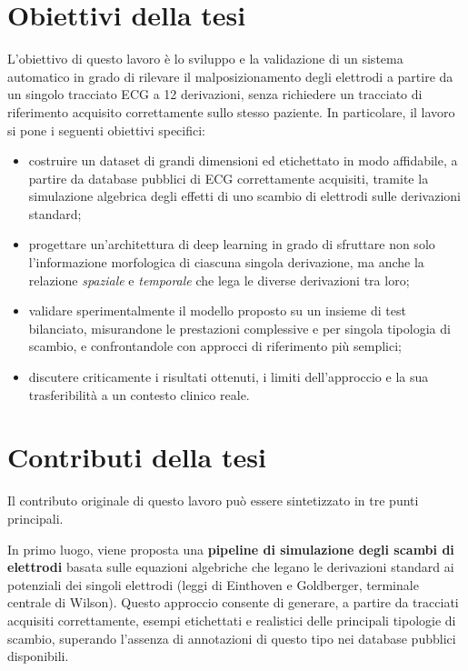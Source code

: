 \section*{Obiettivi della tesi}

L'obiettivo di questo lavoro è lo sviluppo e la validazione di un sistema automatico in grado di rilevare il malposizionamento degli elettrodi a partire da un singolo tracciato ECG a 12 derivazioni, senza richiedere un tracciato di riferimento acquisito correttamente sullo stesso paziente. In particolare, il lavoro si pone i seguenti obiettivi specifici:

\begin{itemize}
    \item costruire un dataset di grandi dimensioni ed etichettato in modo affidabile, a partire da database pubblici di ECG correttamente acquisiti, tramite la simulazione algebrica degli effetti di uno scambio di elettrodi sulle derivazioni standard;
    \item progettare un'architettura di deep learning in grado di sfruttare non solo l'informazione morfologica di ciascuna singola derivazione, ma anche la relazione \emph{spaziale} e \emph{temporale} che lega le diverse derivazioni tra loro;
    \item validare sperimentalmente il modello proposto su un insieme di test bilanciato, misurandone le prestazioni complessive e per singola tipologia di scambio, e confrontandole con approcci di riferimento più semplici;
    \item discutere criticamente i risultati ottenuti, i limiti dell'approccio e la sua trasferibilità a un contesto clinico reale.
\end{itemize}

\section*{Contributi della tesi}

Il contributo originale di questo lavoro può essere sintetizzato in tre punti principali.

In primo luogo, viene proposta una \textbf{pipeline di simulazione degli scambi di elettrodi} basata sulle equazioni algebriche che legano le derivazioni standard ai potenziali dei singoli elettrodi (leggi di Einthoven e Goldberger, terminale centrale di Wilson). Questo approccio consente di generare, a partire da tracciati acquisiti correttamente, esempi etichettati e realistici delle principali tipologie di scambio, superando l'assenza di annotazioni di questo tipo nei database pubblici disponibili.

